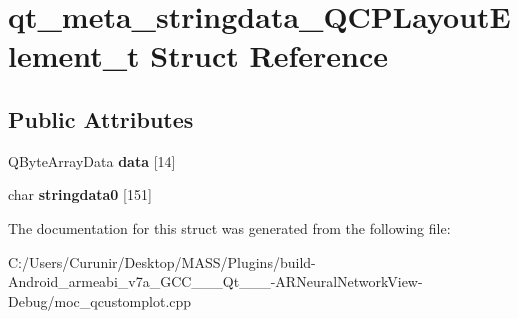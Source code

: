 \hypertarget{structqt__meta__stringdata___q_c_p_layout_element__t}{}\section{qt\+\_\+meta\+\_\+stringdata\+\_\+\+Q\+C\+P\+Layout\+Element\+\_\+t Struct Reference}
\label{structqt__meta__stringdata___q_c_p_layout_element__t}
\subsection*{Public Attributes}
\begin{DoxyCompactItemize}
\item 
\mbox{\label{structqt__meta__stringdata___q_c_p_layout_element__t_a4858561b0533220427dbd64aa687d980}} 
Q\+Byte\+Array\+Data {\bfseries data} \mbox{[}14\mbox{]}
\item 
\mbox{\label{structqt__meta__stringdata___q_c_p_layout_element__t_a0b63dc1c20734a95572094555072a1d5}} 
char {\bfseries stringdata0} \mbox{[}151\mbox{]}
\end{DoxyCompactItemize}


The documentation for this struct was generated from the following file\+:\begin{DoxyCompactItemize}
\item 
C\+:/\+Users/\+Curunir/\+Desktop/\+M\+A\+S\+S/\+Plugins/build-\/\+Android\+\_\+armeabi\+\_\+v7a\+\_\+\+G\+C\+C\+\_\+\_\+\_\+\+Qt\+\_\+\_\+\_-\/\+A\+R\+Neural\+Network\+View-\/\+Debug/moc\+\_\+qcustomplot.\+cpp\end{DoxyCompactItemize}
